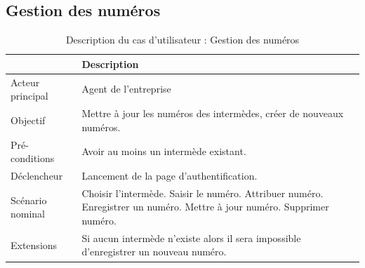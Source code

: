 		\subsection*{Gestion des numéros}
			\begin{table}[H]
				\begin{center}
					{\renewcommand{\arraystretch}{1.5}\begin{tabularx}{\textwidth}{|l|X|}
							\hline & Description \\
							\hline Acteur principal & Agent de l'entreprise \\
							\hline Objectif & Mettre à jour les numéros des intermèdes, créer de nouveaux numéros.\\
							\hline Pré-conditions & Avoir au moins un intermède existant.\\
							\hline Déclencheur & Lancement de la page d'authentification.\\
							\hline
							Scénario nominal &
							Choisir l'intermède.\newline
							Saisir le numéro.\newline
							Attribuer numéro.\newline\newline
							Enregistrer un numéro.\newline
							Mettre à jour numéro.\newline
							Supprimer numéro.\\
							\hline
							Extensions & Si aucun intermède n'existe alors il sera impossible d'enregistrer un nouveau numéro. \\ 
							\hline               
					\end{tabularx}}
				\end{center}
				\caption{Description du cas d'utilisateur : Gestion des numéros}
			\end{table}
